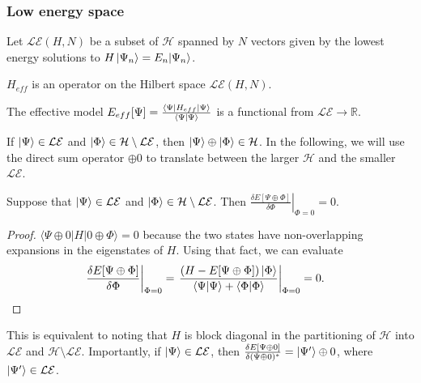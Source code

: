 \subsubsection{Low energy space} 

\begin{definition}
Let $\mathcal{LE}(H,N)$ be a subset of ${\mathcal H}$ spanned by $N$ vectors given by the lowest energy solutions to $H\ket{\Psi_n}=E_n|{\Psi_n}\rangle$. 
\end{definition}

\begin{definition}
$H_{eff}$ is an operator on the Hilbert space ${\mathcal {LE}(H,N)}$.	 
\end{definition}

\begin{definition}
The effective model $E_{eff}[\Psi]=\frac{\bra{\Psi}H_{eff}\ket{\Psi}}{\braket{\Psi|\Psi}}$ is a functional from $\mathcal{LE} \rightarrow \mathbb{R}$. 
\end{definition}

If $\ket{\Psi}\in \mathcal{LE}$ and $\ket{\Phi}\in {\mathcal H} \setminus \mathcal{LE}$, then $\ket{\Psi} \oplus \ket{\Phi} \in {\mathcal H}$.
In the following, we will use the direct sum operator $\oplus 0$ to translate between the larger ${\mathcal H}$ and the smaller $\mathcal{LE}$. 

\begin{lemma}
\label{lemma:zeroderiv}
Suppose that $\ket{\Psi}\in \mathcal{LE}$ and $\ket{\Phi} \in {\mathcal H} \setminus \mathcal{LE}$. 
Then $\left.\frac{\delta E[\Psi \oplus \Phi]}{\delta \Phi}\right|_{\Phi=0}=0$. 
\end{lemma}
\begin{proof}
$\langle \Psi\oplus 0 | H | 0\oplus \Phi \rangle=0$ because the two states have non-overlapping expansions in the eigenstates of $H$. 
Using that fact, we can evaluate
\begin{align}
\left.\frac{\delta E[\Psi \oplus \Phi]}{\delta \Phi}\right|_{\Phi=0} &= \left.\frac{\left(H-E[\Psi\oplus\Phi]\right) \ket{\Phi} }{\braket{\Psi|\Psi} + \braket{\Phi|\Phi}} \right|_{\Phi=0} = 0.
\end{align}
\end{proof}
This is equivalent to noting that $H$ is block diagonal in the partitioning of ${\mathcal H}$ into $\mathcal{LE}$ and ${\mathcal H} \setminus \mathcal{LE}$.
Importantly, if $\ket{\Psi} \in \mathcal{LE}$, then $\frac{\delta  E[\Psi\oplus 0] }{\delta (\Psi\oplus 0)^*} = \ket{\Psi'} \oplus 0$, where $\ket{\Psi'} \in \mathcal{LE} $. 

